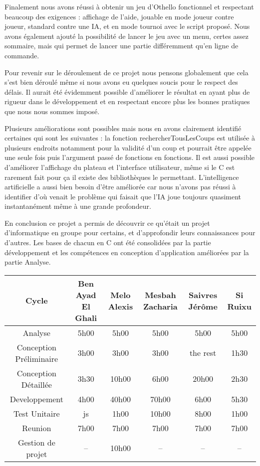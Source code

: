 \hspace{3em}

Finalement nous avons réussi à obtenir un jeu d’Othello fonctionnel et respectant beaucoup des exigences : affichage de l’aide, jouable en mode joueur contre joueur, standard contre une IA, et en mode tournoi avec le script proposé. Nous avons également ajouté la possibilité de lancer le jeu avec un menu, certes assez sommaire, mais qui permet de lancer une partie différemment qu’en ligne de commande.

Pour revenir sur le déroulement de ce projet nous pensons globalement que cela s’est bien déroulé même si nous avons eu quelques soucis pour le respect des délais. Il aurait été évidemment possible d’améliorer le résultat en ayant plus de rigueur dans le développement et en respectant encore plus les bonnes pratiques que nous nous sommes imposé.

Plusieurs améliorations sont possibles mais nous en avons clairement identifié certaines qui sont les suivantes : la fonction rechercherTousLesCoups est utilisée à plusieurs endroits notamment pour la validité d’un coup et pourrait être appelée une seule fois puis l’argument passé de fonctions en fonctions. Il est aussi possible d’améliorer l’affichage du plateau et l’interface utilisateur, même si le C est rarement fait pour ça il existe des bibliothèques le permettant. L’intelligence artificielle a aussi bien besoin d’être améliorée car nous n’avons pas réussi à identifier d’où venait le problème qui faisait que l’IA joue toujours quasiment instantanément même à une grande profondeur.



En conclusion ce projet a permis de découvrir ce qu’était un projet d’informatique en groupe pour certains, et d’approfondir leurs connaissances pour d’autres. Les bases de chacun en C ont été consolidées par la partie développement et les compétences en conception d’application améliorées par la partie Analyse.
\begin{tabular}{|*{6}{c|}}
    \hline
   	Cycle  & Ben Ayad El Ghali  & Melo Alexis  & Mesbah Zacharia  & Saivres Jérôme  & Si Ruixu \\
    \hline
    Analyse  & 5h00  & 5h00  & 5h00  &  5h00  & 5h00  \\
    \hline
   	Conception Préliminaire & 3h00  & 3h00  & 3h00  & the rest & 1h30 \\
    \hline
   	Conception Détaillée & 3h30  & 10h00  & 6h00  & 20h00  & 2h30 \\
    \hline
   	 Developpement & 4h00  & 40h00  &  70h00 & 6h00  & 5h30 \\
    \hline
   	 Test Unitaire  &js  & 1h00  & 10h00  & 8h00 & 1h00 \\
    \hline
   	 Reunion  & 7h00  & 7h00  & 7h00  & 7h00 & 7h00 \\
    \hline
   	 Gestion de projet & -- & 10h00  & --  & -- & -- \\
    \hline
\end{tabular}
